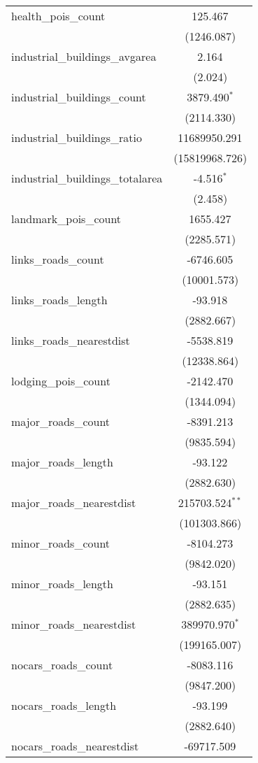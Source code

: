 \begin{table}[!htbp]
\begin{tabular}{@{\extracolsep{5pt}}lc}
 health_pois_count & 125.467$^{}$ \\
  & (1246.087) \\
 industrial_buildings_avgarea & 2.164$^{}$ \\
  & (2.024) \\
 industrial_buildings_count & 3879.490$^{*}$ \\
  & (2114.330) \\
 industrial_buildings_ratio & 11689950.291$^{}$ \\
  & (15819968.726) \\
 industrial_buildings_totalarea & -4.516$^{*}$ \\
  & (2.458) \\
 landmark_pois_count & 1655.427$^{}$ \\
  & (2285.571) \\
 links_roads_count & -6746.605$^{}$ \\
  & (10001.573) \\
 links_roads_length & -93.918$^{}$ \\
  & (2882.667) \\
 links_roads_nearestdist & -5538.819$^{}$ \\
  & (12338.864) \\
 lodging_pois_count & -2142.470$^{}$ \\
  & (1344.094) \\
 major_roads_count & -8391.213$^{}$ \\
  & (9835.594) \\
 major_roads_length & -93.122$^{}$ \\
  & (2882.630) \\
 major_roads_nearestdist & 215703.524$^{**}$ \\
  & (101303.866) \\
 minor_roads_count & -8104.273$^{}$ \\
  & (9842.020) \\
 minor_roads_length & -93.151$^{}$ \\
  & (2882.635) \\
 minor_roads_nearestdist & 389970.970$^{*}$ \\
  & (199165.007) \\
 nocars_roads_count & -8083.116$^{}$ \\
  & (9847.200) \\
 nocars_roads_length & -93.199$^{}$ \\
  & (2882.640) \\
 nocars_roads_nearestdist & -69717.509$^{}$ \\

\end{tabular}
\end{table}
